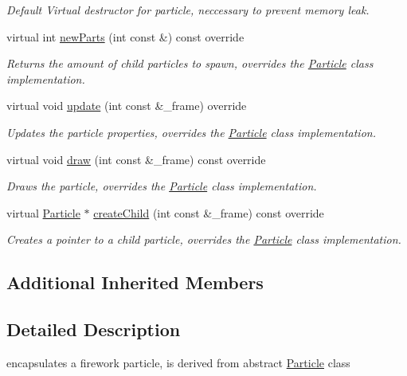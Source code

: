 \begin{DoxyCompactItemize}
\begin{DoxyCompactList}\small\item\em Default Virtual destructor for particle, neccessary to prevent memory leak. \end{DoxyCompactList}\item 
virtual int \hyperlink{classFireworkParticle_ac0149d0e10dc1e20d108354543f15299}{new\-Parts} (int const \&) const override
\begin{DoxyCompactList}\small\item\em Returns the amount of child particles to spawn, overrides the \hyperlink{classParticle}{Particle} class implementation. \end{DoxyCompactList}\item 
virtual void \hyperlink{classFireworkParticle_aacfe5d5991b4585c176d9e2315d0d293}{update} (int const \&\-\_\-frame) override
\begin{DoxyCompactList}\small\item\em Updates the particle properties, overrides the \hyperlink{classParticle}{Particle} class implementation. \end{DoxyCompactList}\item 
virtual void \hyperlink{classFireworkParticle_a495692a1f1f4a340c3d548215fd5e5d0}{draw} (int const \&\-\_\-frame) const override
\begin{DoxyCompactList}\small\item\em Draws the particle, overrides the \hyperlink{classParticle}{Particle} class implementation. \end{DoxyCompactList}\item 
virtual \hyperlink{classParticle}{Particle} $\ast$ \hyperlink{classFireworkParticle_a29256978e2558abb2fc808e3b96b8000}{create\-Child} (int const \&\-\_\-frame) const override
\begin{DoxyCompactList}\small\item\em Creates a pointer to a child particle, overrides the \hyperlink{classParticle}{Particle} class implementation. \end{DoxyCompactList}\end{DoxyCompactItemize}
\subsection*{Additional Inherited Members}


\subsection{Detailed Description}
encapsulates a firework particle, is derived from abstract \hyperlink{classParticle}{Particle} class 

